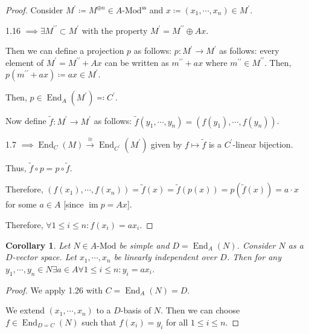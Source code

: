 \documentclass{article}
\theoremstyle{definition}
\theoremstyle{plain}
\newtheorem{corollary}[theorem]{Corollary}
\theoremstyle{remark}
\begin{document}
    \begin{proof}
        Consider \(M^{\prime} \coloneqq M^{\oplus n} \in A\text{-Mod}^{\text{ss}}\) and \(x \coloneqq (x_1 , \cdots , x_n) \in M^{\prime}\).
        
        1.16 \(\implies \exists M^{\prime\prime} \subset M^{\prime}\) with the property \(M^{\prime} = M^{\prime\prime} \oplus Ax\).

        Then we can define a projection \(p\) as follows: \(p: M^{\prime} \to M^{\prime}\) as follows: every element of \(M^{\prime} = M^{\prime\prime} + Ax\) can be written as \(m^{\prime\prime} + ax\) where \(m^{\prime\prime} \in M^{\prime\prime}\). Then, \(p(m^{\prime\prime} + ax) \coloneqq ax \in M^{\prime}\).

        Then, \(p\in \operatorname{End}_A(M^{\prime}) \eqqcolon C^{\prime}\).
        
        Now define \(\widetilde{f}: M^{\prime} \to M^{\prime}\) as follows: \(\widetilde{f}(y_1 , \cdots , y_n) = (f(y_1) , \cdots , f(y_n))\).

        1.7 \(\implies \operatorname{End}_C (M) \xrightarrow{\cong} \operatorname{End}_{C^{\prime}}(M^{\prime})\) given by \(f \mapsto \widetilde{f}\) is a \(C^{\prime}\)-linear bijection.

        Thus, \(\widetilde{f} \circ p = p \circ \widetilde{f}\).

        Therefore, \((f(x_1), \cdots , f(x_n)) = \widetilde{f}(x) = \widetilde{f}(p(x)) = p(\widetilde{f}(x)) = a \cdot x\) for some \(a\in A\) [since \(\operatorname{im} p = Ax\)].

        Therefore, \(\forall 1 \leq i \leq n : f(x_i) = a x_i\).
    \end{proof}

    \begin{corollary}
        Let \(N\in A\text{-Mod}\) be simple and \(D = \operatorname{End}_A(N)\). Consider \(N\) as a \(D\)-vector space. Let \(x_1 , \cdots , x_n\) be linearly independent over \(D\). Then for any \(y_1 , \cdots , y_n \in N \exists a \in A \forall 1 \leq i \leq n : y_i = a x_i\). 
    \end{corollary}

    \begin{proof}
        We apply 1.26 with \(C = \operatorname{End}_A(N) = D\).

        We extend \((x_1 , \cdots , x_n)\) to a \(D\)-basis of \(N\). Then we can choose \(f \in \operatorname{End}_{D = C} (N)\) such that \(f(x_i) = y_i\) for all \(1 \leq i \leq n\).
    \end{proof}
\end{document}
